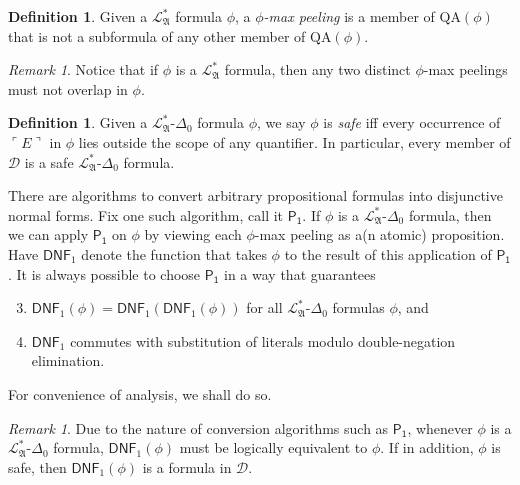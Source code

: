 \documentclass[12pt, twoside]{memoir}
\numberwithin{equation}{section}
\theoremstyle{definition}
\newtheorem{defi}[thm]{Definition}
\theoremstyle{remark}
\newtheorem{rem}[thm]{Remark}
\theoremstyle{definition}
\theoremstyle{definition}
\theoremstyle{definition}
\theoremstyle{remark}
\begin{document}
\begin{defi}
Given a $\mathcal{L}^{*}_{\mathfrak{A}}$ formula $\phi$, a $\phi$\emph{-max peeling} is a member of $\mathrm{QA}(\phi)$ that is not a subformula of any other member of $\mathrm{QA}(\phi)$.
\end{defi}

\begin{rem}\label{rem320}
Notice that if $\phi$ is a $\mathcal{L}^{*}_{\mathfrak{A}}$ formula, then any two distinct $\phi$-max peelings must not overlap in $\phi$.
\end{rem} 

\begin{defi}
Given a $\mathcal{L}^{*}_{\mathfrak{A}}$-$\Delta_0$ formula $\phi$, we say $\phi$ is \emph{safe} iff every occurrence of $\ulcorner E \urcorner$ in $\phi$ lies outside the scope of any quantifier. In particular, every member of $\mathcal{D}$ is a safe $\mathcal{L}^{*}_{\mathfrak{A}}$-$\Delta_0$ formula.
\end{defi}

There are algorithms to convert arbitrary propositional formulas into disjunctive normal forms. Fix one such algorithm, call it $\mathsf{P_1}$. If $\phi$ is a $\mathcal{L}^{*}_{\mathfrak{A}}$-$\Delta_0$ formula, then we can apply $\mathsf{P_1}$ on $\phi$ by viewing each $\phi$-max peeling as a(n atomic) proposition. Have $\mathsf{DNF}_1$ denote the function that takes $\phi$ to the result of this application of $\mathsf{P_1}$. It is always possible to choose $\mathsf{P_1}$ in a way that guarantees
\begin{enumerate}[label=(\Roman*)]
    \setcounter{enumi}{2}
    \item\label{s323} $\mathsf{DNF}_1(\phi) = \mathsf{DNF}_1(\mathsf{DNF}_1(\phi))$ for all $\mathcal{L}^{*}_{\mathfrak{A}}$-$\Delta_0$ formulas $\phi$, and
    \item\label{s324} $\mathsf{DNF}_1$ commutes with substitution of literals modulo double-negation elimination.
\end{enumerate}
For convenience of analysis, we shall do so.

\begin{rem}\label{rem322}
Due to the nature of conversion algorithms such as $\mathsf{P_1}$, whenever $\phi$ is a $\mathcal{L}^{*}_{\mathfrak{A}}$-$\Delta_0$ formula, $\mathsf{DNF}_1(\phi)$ must be logically equivalent to $\phi$. If in addition, $\phi$ is safe, then $\mathsf{DNF}_1(\phi)$ is a formula in $\mathcal{D}$.
\end{rem}
\end{document}
